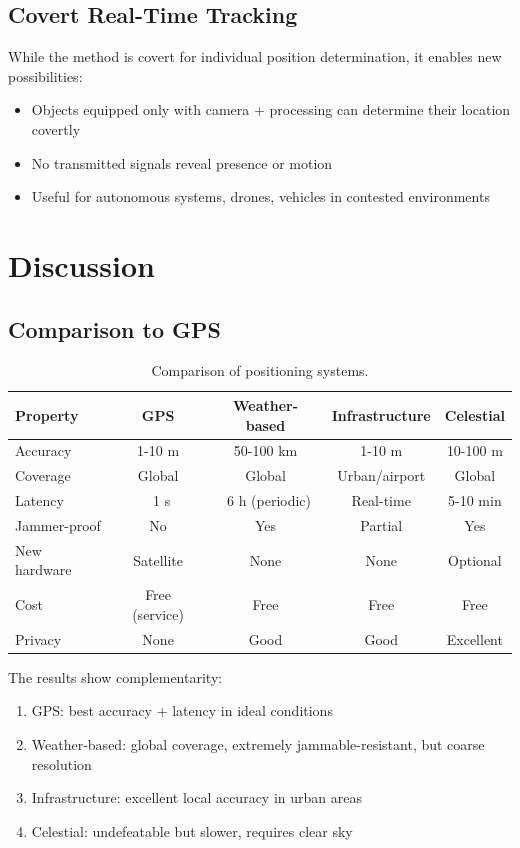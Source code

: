 \documentclass[11pt,twocolumn,a4paper]{article}
\theoremstyle{definition}
\begin{document}
\subsection{Covert Real-Time Tracking}

While the method is covert for individual position determination, it enables new possibilities:
\begin{itemize}[nosep]
\item Objects equipped only with camera + processing can determine their location covertly
\item No transmitted signals reveal presence or motion
\item Useful for autonomous systems, drones, vehicles in contested environments
\end{itemize}

\section{Discussion}
\label{sec:discussion}

\subsection{Comparison to GPS}

\begin{table}[H]
\centering\small
\caption{Comparison of positioning systems.}
\begin{tabular}{lcccc}
\toprule
Property & GPS & Weather-based & Infrastructure & Celestial \\
\midrule
Accuracy & 1-10 m & 50-100 km & 1-10 m & 10-100 m \\
Coverage & Global & Global & Urban/airport & Global \\
Latency & ~1 s & ~6 h (periodic) & Real-time & 5-10 min \\
Jammer-proof & No & Yes & Partial & Yes \\
New hardware & Satellite & None & None & Optional \\
Cost & Free (service) & Free & Free & Free \\
Privacy & None & Good & Good & Excellent \\
\bottomrule
\end{tabular}
\end{table}

The results show complementarity:
\begin{enumerate}[nosep]
\item GPS: best accuracy + latency in ideal conditions
\item Weather-based: global coverage, extremely jammable-resistant, but coarse resolution
\item Infrastructure: excellent local accuracy in urban areas
\item Celestial: undefeatable but slower, requires clear sky
\end{enumerate}
\end{document}

